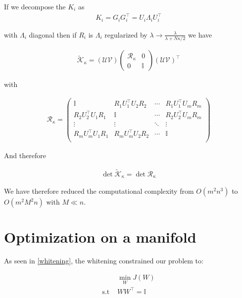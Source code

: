 \documentclass[a4paper,BCOR=5mm,oneside,openany]{scrreprt}
\begin{document}
If we decompose the $K_i$ as
\begin{align*}
	K_i = G_i G_i^\intercal = U_i \Lambda_i U_i^\intercal
\end{align*}

with $\Lambda_i$ diagonal then if $R_i$ is $\Lambda_i$ regularized by $\lambda \to \frac{\lambda}{\lambda + N \kappa / 2}$ we have

\begin{align*}
	\tilde{\mathcal{K}}_\kappa = (\mathcal{U} \mathcal{V}) \begin{pmatrix}
		\mathcal{R}_\kappa & 0 \\
		0 & \mathbb{I}
	\end{pmatrix} (\mathcal{U} \mathcal{V})^\intercal
\end{align*}

with

\begin{align*}
	\mathcal{R}_\kappa =  \begin{pmatrix}
		\mathbb{I} & R_1 U_1^\intercal U_2 R_2  & \cdots &  R_1 U_1^\intercal U_m R_m \\
		R_2 U_2^\intercal U_1 R_1 & \mathbb{I} & \cdots & R_2 U_2^\intercal U_m R_m \\
		\vdots & \vdots & \ddots & \vdots \\
		R_m U_m^\intercal U_1 R_1 & R_m U_m^\intercal U_2 R_2 & \cdots & \mathbb{I} \\
	\end{pmatrix}
\end{align*}

And therefore

\begin{align*}
	\det \tilde{\mathcal{K}}_\kappa = \det \mathcal{R}_\kappa
\end{align*}

We have therefore reduced the computational complexity from $O(m^2 n^3)$ to $O(m^2 M^2 n)$ with $M \ll n$.

\section{Optimization on a manifold}

As seen in \ref{whitening}, the whitening constrained our problem to:

\begin{align*}
	&\min_W J(W) \\
	\text{s.t } &W W^\intercal = \mathbb{I}
\end{align*}
\end{document}
